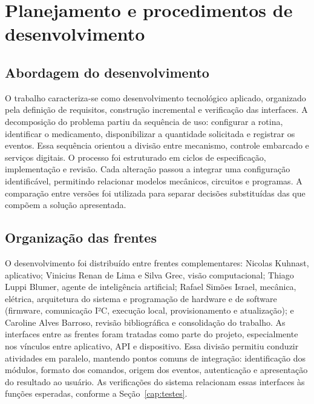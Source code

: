 \section{Planejamento e procedimentos de desenvolvimento}\label{sec:planejamento}
\subsection{Abordagem do desenvolvimento}
O trabalho caracteriza-se como desenvolvimento tecnológico aplicado, organizado pela definição de requisitos, construção incremental e verificação das interfaces.
A decomposição do problema partiu da sequência de uso: configurar a rotina, identificar o medicamento, disponibilizar a quantidade solicitada e registrar os eventos.
Essa sequência orientou a divisão entre mecanismo, controle embarcado e serviços digitais.
O processo foi estruturado em ciclos de especificação, implementação e revisão.
Cada alteração passou a integrar uma configuração identificável, permitindo relacionar modelos mecânicos, circuitos e programas.
A comparação entre versões foi utilizada para separar decisões substituídas das que compõem a solução apresentada.
\subsection{Organização das frentes}
O desenvolvimento foi distribuído entre frentes complementares: Nicolas Kuhnast, aplicativo; Vinicius Renan de Lima e Silva Grec, visão computacional; Thiago Luppi Blumer, agente de inteligência artificial; Rafael Simões Israel, mecânica, elétrica, arquitetura do sistema e programação de hardware e de software (firmware, comunicação I²C, execução local, provisionamento e atualização); e Caroline Alves Barroso, revisão bibliográfica e consolidação do trabalho.
As interfaces entre as frentes foram tratadas como parte do projeto, especialmente nos vínculos entre aplicativo, API e dispositivo.
Essa divisão permitiu conduzir atividades em paralelo, mantendo pontos comuns de integração: identificação dos módulos, formato dos comandos, origem dos eventos, autenticação e apresentação do resultado ao usuário.
As verificações do sistema relacionam essas interfaces às funções esperadas, conforme a Seção~\ref{cap:testes}.
